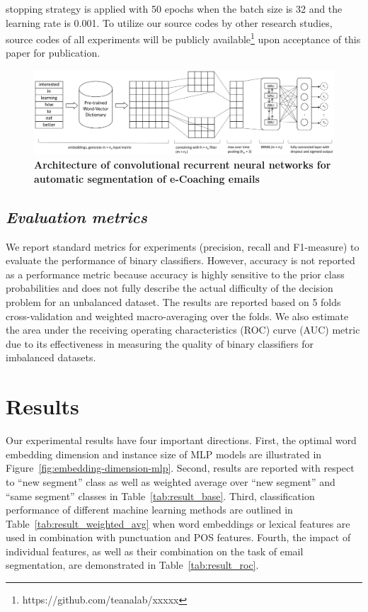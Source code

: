 \documentclass{amia}
\begin{document}
stopping strategy is applied with 50 epochs when the batch size is 32 and the learning rate is 0.001. To utilize our source codes by other research studies, source codes of all experiments will be publicly available\footnote{https://github.com/teanalab/xxxxx} upon acceptance of this paper for publication.

\begin{figure}[!htb]
    \centering
    \includegraphics[width=1.0\textwidth]{figures/CRNN.eps}
    \caption{\textbf{Architecture of convolutional recurrent neural networks for automatic segmentation of e-Coaching emails}}
    \label{fig:crnn}
\end{figure}
  
\subsection*{\textit{Evaluation metrics}}
We report standard metrics for experiments (precision, recall and F1-measure) to evaluate the performance of binary classifiers.\cite{aas1999text} However, accuracy is not reported as a performance metric because accuracy is highly sensitive to the prior class probabilities and does not fully describe the actual difficulty of the decision problem for an unbalanced dataset. The results are reported based on 5 folds cross-validation and weighted macro-averaging over the folds. We also estimate the area under the receiving operating characteristics (ROC) curve\cite{kumar2011receiver} (AUC) metric due to its effectiveness in measuring the quality of binary classifiers for imbalanced datasets. \cite{hu2015kernelized}

\section*{Results}
Our experimental results have four important directions. First, the optimal word embedding dimension and instance size of MLP models are illustrated in Figure~\ref{fig:embedding-dimension-mlp}. Second, results are reported with respect to ``new segment'' class as well as weighted average over ``new segment'' and ``same segment'' classes in Table~\ref{tab:result_base}. Third, classification performance of different machine learning methods are outlined in Table~\ref{tab:result_weighted_avg} when word embeddings or lexical features are used in combination with punctuation and POS features. Fourth, the impact of individual features, as well as their combination on the task of email segmentation, are demonstrated in Table~\ref{tab:result_roc}.
\end{document}
